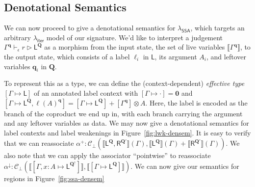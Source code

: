 \documentclass[acmsmall,screen,review]{acmart}
\newcommand{\mc}[1]{\ensuremath{\mathcal{#1}}}
\newcommand{\mb}[1]{\ensuremath{\mathbf{#1}}}
\newcommand{\ms}[1]{\ensuremath{\mathsf{#1}}}
\newcommand{\haslb}[4]{#1 \vdash_{#2} #3 \rhd #4}
\newcommand{\etoty}[1]{[#1]}
\newcommand{\ltoty}[2]{[#1 \mapsto #2]}
\newcommand{\dnt}[1]{\llbracket{#1}\rrbracket}
\newcommand{\subiterexp}{\texorpdfstring{\(\lambda_{\ms{iter}}\)}{lambda-iter}}
\newcommand{\isotopessa}{\(\lambda_{\ms{SSA}}\)}
\newcommand{\zeroqv}[1]{#1^\uparrow}
\begin{document}
\subsection{Denotational Semantics}

We can now proceed to give a denotational semantics for \isotopessa{}, which targets an arbitrary
\subiterexp{} model of our signature. We'd like to interpret a judgement
$\haslb{\Gamma^{\mb{q}}}{\epsilon}{r}{\ms{L}^{\mb{Q}}}$ as a morphism from the input state, the set
of live variables $\dnt{\Gamma^{\mb{q}}}$, to the output state, which consists of a label $\ell_i$
in $\ms{L}$, its argument $A_i$, and leftover variables $\mb{q}_i$ in $\mb{Q}$. 

To represent this as a type, we can define the (context-dependent) \emph{effective type}
$\ltoty{\Gamma}{\ms{L}}$ of an annotated label context with $\ltoty{\Gamma}{\cdot} = \mb{0}$ and
$\ltoty{\Gamma}{\ms{L}^{\mb{Q}}, \ell(A)^{\mb{q}}} = \ltoty{\Gamma}{\ms{L}^{\mb{Q}}} +
\etoty{\Gamma^{\mb{q}}} \otimes A$.    
Here, the label is encoded as the branch of the coproduct we end up in, with each branch carrying
the argument and any leftover variables as data. We may now give a denotational semantics for label 
contexts and label weakenings in Figure~\ref{fig:lwk-densem}. 
It is easy to verify that we can reassociate 
$
\alpha^+ : \mc{C}_\bot(
  \dnt{\ms{L}^{\mb{Q}}, \ms{R}^{\mb{Q}'}}(\Gamma),
  \dnt{\ms{L}^{\mb{Q}}}(\Gamma) + \dnt{\ms{R}^{\mb{Q}'}}(\Gamma)
)
$.
We also note that we can apply the 
associator ``pointwise'' to reassociate
$\alpha^\downarrow: \mc{C}_\bot(
  \dnt{\ltoty{\Gamma, x : A}{\ms{L}^{\zeroqv{\mb{Q}}}}}, 
  \dnt{\ltoty{\Gamma}{\ms{L}^{\mb{Q}}}}
)$. 
%
We can now give our semantics for regions in Figure~\ref{fig:ssa-densem}
\end{document}
